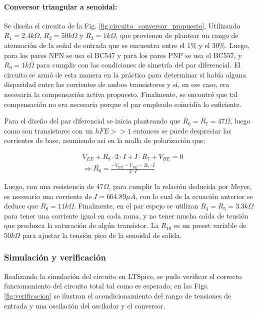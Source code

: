 \paragraph{Conversor triangular a senoidal:} Se dise\~na el circuito de la Fig. \ref{fig:circuito_conversor_propuesto}. Utilizando $R_1 = 2.4k \Omega$, $R_2 = 50k \Omega$ y $R_3 = 1k \Omega$, que provienen de plantear un rango de atenuaci\'on
de la se\~nal de entrada que se encuentra entre el $1\%$ y el $30\%$. Luego, para los pares NPN se usa el BC547 y para los pares PNP se usa el BC557, y $R_9 = 1k \Omega$ para cumplir con las condiciones de simetr\'ia del par diferencial.
El circuito se arm\'o de esta manera en la pr\'actica para determinar si hab\'ia alguna disparidad entre las corrientes de ambos transistores y si, en ese caso, era necesaria la compensaci\'on activa propuesto. Finalmente,
se encontr\'o que tal compensaci\'on no era necesaria porque el par empleado coincid\'ia lo suficiente.

Para el dise\~no del par diferencial se inicia planteando que $R_6 = R_7 = 47 \Omega$, luego como son transistores con un $hFE >> 1$ entonces se puede despreciar las corrientes de base,
asumiendo as\'i en la malla de polarizaci\'on que:

\begin{align*}
    & V_{EE} + R_8 \cdot 2 \cdot I + I \cdot R_7 + V_{BE} = 0 \\
    & \Rightarrow R_8 = \frac{-V_{EE} - V_{BE} - R_7 \cdot I}{2 \cdot I}
\end{align*}

Luego, con una resistencia de $47 \Omega$, para cumplir la relaci\'on deducida por Meyer, es necesario una corriente de $I = 664.89 \mu A$, con lo cual
de la ecuaci\'on anterior se deduce que $R_8 = 11k \Omega$. Finalmente, en el par espejo se utilizan $R_4 = R_5 = 3.3 k \Omega$ para tener una corriente igual en cada rama,
y no tener mucha ca\'ida de tensi\'on que produzca la saturaci\'on de alg\'un transistor. La $R_{10}$ es un preset variable de $50 k \Omega$ para ajustar la tensi\'on pico de la senoidal
de salida.

\subsubsection{Simulaci\'on y verificaci\'on}
Realizando la simulaci\'on del circuito en LTSpice, se pudo verificar el correcto funcionamiento del circuito total tal como es esperado,
en las Figs. \ref{fig:verificacion} se ilustran el acondicionamiento del rango de tensiones de entrada y una oscilaci\'on del oscilador y el conversor.


